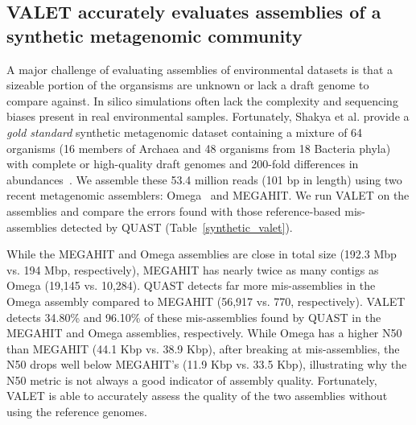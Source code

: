 %
\subsection{VALET accurately evaluates assemblies of a synthetic metagenomic community}

A major challenge of evaluating assemblies of environmental datasets is that a sizeable portion of the organsisms are unknown or lack a draft genome to compare against.
In silico simulations often lack the complexity and sequencing biases present in real environmental samples.
Fortunately, Shakya et al. provide a \emph{gold standard} synthetic metagenomic dataset containing a mixture of 64 organisms (16 members of Archaea and 48 organisms from 18 Bacteria phyla) with complete or high-quality draft genomes and 200-fold differences in abundances~\cite{shakya2013comparative}.
We assemble these 53.4 million reads (101 bp in length) using two recent metagenomic assemblers: Omega~\cite{haider2014omega} and MEGAHIT\cite{li2015megahit}.
We run VALET on the assemblies and compare the errors found with those reference-based mis-assemblies detected by QUAST (Table~\ref{synthetic_valet}).


While the MEGAHIT and Omega assemblies are close in total size (192.3 Mbp vs. 194 Mbp, respectively), MEGAHIT has nearly twice as many contigs as Omega (19,145 vs. 10,284).
QUAST detects far more mis-assemblies in the Omega assembly compared to MEGAHIT (56,917 vs. 770, respectively).
VALET detects 34.80\% and 96.10\% of these mis-assemblies found by QUAST in the MEGAHIT and Omega assemblies, respectively.
While Omega has a higher N50 than MEGAHIT (44.1 Kbp vs. 38.9 Kbp), after breaking at mis-assemblies, the N50 drops well below MEGAHIT's (11.9 Kbp vs. 33.5 Kbp), illustrating why the N50 metric is not always a good indicator of assembly quality.
Fortunately, VALET is able to accurately assess the quality of the two assemblies without using the reference genomes.


